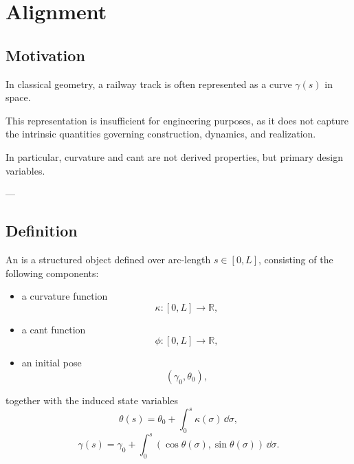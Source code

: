 \section{Alignment}

\subsection{Motivation}

\begin{remark}
In classical geometry, a railway track is often represented as a curve
\(\gamma(s)\) in space.
\end{remark}

\begin{remark}
This representation is insufficient for engineering purposes, as it
does not capture the intrinsic quantities governing construction,
dynamics, and realization.
\end{remark}

\begin{remark}
In particular, curvature and cant are not derived properties, but
primary design variables.
\end{remark}

---

\subsection{Definition}

\begin{definition}[Alignment]
An  is a structured object defined over arc-length
\(s \in [0,L]\), consisting of the following components:

\begin{itemize}
\item a curvature function
\[
\kappa : [0,L] \rightarrow \mathbb{R},
\]

\item a cant function
\[
\phi : [0,L] \rightarrow \mathbb{R},
\]

\item an initial pose
\[
(\gamma_0, \theta_0),
\]

\end{itemize}

together with the induced state variables
\[
\theta(s) = \theta_0 + \int_0^s \kappa(\sigma)\,\dd\sigma,
\]
\[
\gamma(s) = \gamma_0 + \int_0^s (\cos\theta(\sigma), \sin\theta(\sigma))\,\dd\sigma.
\]
\end{definition}

